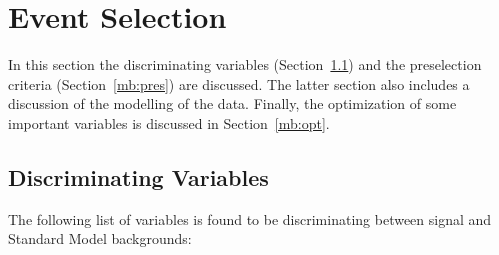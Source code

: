 \section{Event Selection}\label{mbselection}

In this section the discriminating variables (Section~\ref{mb:disv}) and the
preselection criteria (Section~\ref{mb:pres}) are discussed. The latter section
also includes a discussion of the modelling of the data. Finally, the
optimization of some important variables is discussed in Section~\ref{mb:opt}.

\subsection{Discriminating Variables}\label{mb:disv}

The following list of variables is found to be discriminating between signal
and Standard Model backgrounds:

